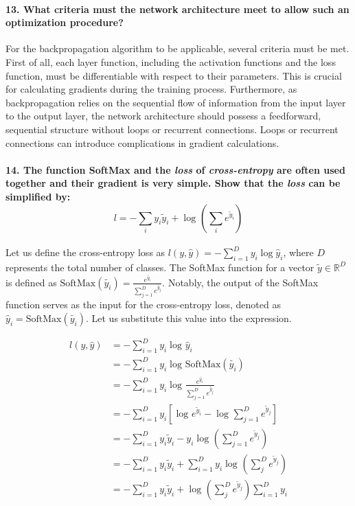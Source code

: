 \paragraph{13. What criteria must the network architecture meet to allow such an optimization procedure?}
For the backpropagation algorithm to be applicable, several criteria must be met. First of all, each layer function, including the activation functions and the loss function, must be differentiable with respect to their parameters. This is crucial for calculating gradients during the training process. Furthermore, as backpropagation relies on the sequential flow of information from the input layer to the output layer, the network architecture should possess a feedforward, sequential structure without loops or recurrent connections. Loops or recurrent connections can introduce complications in gradient calculations.

\paragraph{14. The function SoftMax and the \textit{loss} of \textit{cross-entropy} are often used together and their gradient is very simple. Show that the \textit{loss} can be simpliﬁed by:
    \[l = - \sum_{i}^{} y_i \tilde{y}_i + \log_{} \left(\sum_{i}^{} e^{\tilde{y}_i}\right)\]}
Let us define the cross-entropy loss as \( l(y, \hat{y}) = - \sum_{i=1}^{D} y_i \log \hat{y}_i \), where \( D \) represents the total number of classes. The SoftMax function for a vector \( \tilde{y} \in \mathbb{R}^D \) is defined as \( \text{SoftMax}(\tilde{y_i}) = \frac{e^{\tilde{y_i}}}{\sum_{j=1}^{D} e^{\tilde{y_j}}} \). Notably, the output of the SoftMax function serves as the input for the cross-entropy loss, denoted as \( \hat{y}_i = \text{SoftMax}(\tilde{y_i}) \). Let us substitute this value into the expression.

\begin{align*}
    l(y, \hat{y}) & = - \sum_{i=1}^{D} y_i \log_{} \hat{y}_i                                                                 \\
                  & = - \sum_{i=1}^{D} y_i \log_{} \text{SoftMax}(\tilde{y_i})                                               \\
                  & = - \sum_{i=1}^{D} y_i \log_{} \frac{e^{\tilde{y_i}}}{\sum_{j=1}^{D} e^{\tilde{y_j}} }                   \\
                  & = - \sum_{i=1}^{D} y_i \left[ \log_{} e^{\tilde{y}_i} - \log_{} \sum_{j=1}^{D} e^{\tilde{y}_j}  \right]  \\
                  & = - \sum_{i=1}^{D} y_i \tilde{y}_i - y_i \log_{} \left( \sum_{j=1}^{D}e^{\tilde{y}_j} \right)                           \\
                  & = - \sum_{i=1}^{D} y_i \tilde{y}_i + \sum_{i=1}^{D} y_i \log_{} \left(\sum_{j}^{D}e^{\tilde{y}_j}\right) \\
                  & = - \sum_{i=1}^{D} y_i \tilde{y}_i + \log_{} \left(\sum_{j}^{D}e^{\tilde{y}_j}\right) \sum_{i=1}^{D} y_i
\end{align*}

